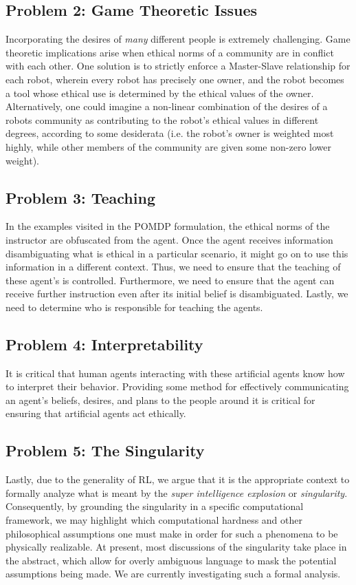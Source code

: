 \documentclass[11pt]{article}
\begin{document}
\subsection{Problem 2: Game Theoretic Issues} Incorporating the desires of {\it many} different people is extremely challenging. Game theoretic implications arise when ethical norms of a community are in conflict with each other. One solution is to strictly enforce a Master-Slave relationship for each robot, wherein every robot has precisely one owner, and the robot becomes a tool whose ethical use is determined by the ethical values of the owner. Alternatively, one could imagine a non-linear combination of the desires of a robots community as contributing to the robot's ethical values in different degrees, according to some desiderata (i.e. the robot's owner is weighted most highly, while other members of the community are given some non-zero lower weight).

\subsection{Problem 3: Teaching} In the examples visited in the POMDP formulation, the ethical norms of the instructor are obfuscated from the agent. Once the agent receives information disambiguating what is ethical in a particular scenario, it might go on to use this information in a different context. Thus, we need to ensure that the teaching of these agent's is controlled. Furthermore, we need to ensure that the agent can receive further instruction even after its initial belief is disambiguated. Lastly, we need to determine who is responsible for teaching the agents.

\subsection{Problem 4: Interpretability} It is critical that human agents interacting with these artificial agents know how to interpret their behavior. Providing some method for effectively communicating an agent's beliefs, desires, and plans to the people around it is critical for ensuring that artificial agents act ethically.

\subsection{Problem 5: The Singularity} Lastly, due to the generality of RL, we argue that it is the appropriate context to formally analyze what is meant by the {\it super intelligence explosion} or {\it singularity}. Consequently, by grounding the singularity in a specific computational framework, we may highlight which computational hardness and other philosophical assumptions one must make in order for such a phenomena to be physically realizable. At present, most discussions of the singularity take place in the abstract, which allow for overly ambiguous language to mask the potential assumptions being made. We are currently investigating such a formal analysis.
\end{document}
